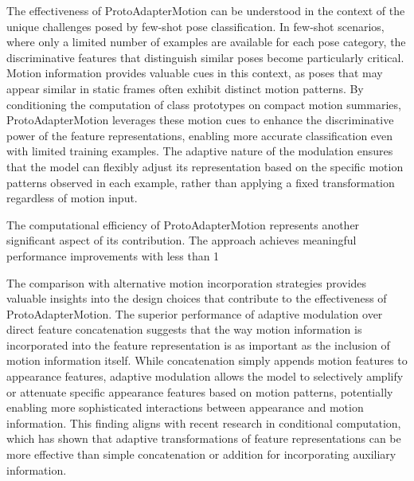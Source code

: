 \documentclass[11pt]{article}
\begin{document}
The effectiveness of ProtoAdapterMotion can be understood in the context of the unique challenges posed by few-shot pose classification. In few-shot scenarios, where only a limited number of examples are available for each pose category, the discriminative features that distinguish similar poses become particularly critical. Motion information provides valuable cues in this context, as poses that may appear similar in static frames often exhibit distinct motion patterns. By conditioning the computation of class prototypes on compact motion summaries, ProtoAdapterMotion leverages these motion cues to enhance the discriminative power of the feature representations, enabling more accurate classification even with limited training examples. The adaptive nature of the modulation ensures that the model can flexibly adjust its representation based on the specific motion patterns observed in each example, rather than applying a fixed transformation regardless of motion input.

The computational efficiency of ProtoAdapterMotion represents another significant aspect of its contribution. The approach achieves meaningful performance improvements with less than 1%

The comparison with alternative motion incorporation strategies provides valuable insights into the design choices that contribute to the effectiveness of ProtoAdapterMotion. The superior performance of adaptive modulation over direct feature concatenation suggests that the way motion information is incorporated into the feature representation is as important as the inclusion of motion information itself. While concatenation simply appends motion features to appearance features, adaptive modulation allows the model to selectively amplify or attenuate specific appearance features based on motion patterns, potentially enabling more sophisticated interactions between appearance and motion information. This finding aligns with recent research in conditional computation, which has shown that adaptive transformations of feature representations can be more effective than simple concatenation or addition for incorporating auxiliary information.
\end{document}
